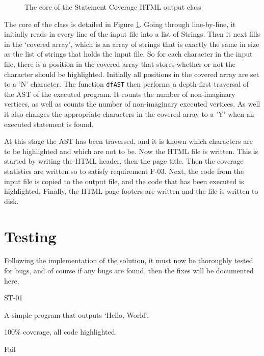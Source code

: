 
\begin{figure}[h]
	
	\caption{The core of the Statement Coverage HTML output class}
	\label{lst:StatementCoverageHTMLCore}
\end{figure}

The core of the class is detailed in Figure \ref{lst:StatementCoverageHTMLCore}. Going through line-by-line, it initially reads in every line of the input file into a list of Strings. Then it next fills in the `covered array', which is an array of strings that is exactly the same in size as the list of strings that holds the input file. So for each character in the input file, there is a position in the covered array that stores whether or not the character should be highlighted. Initially all positions in the covered array are set to a 'N' character. The function \verb|dfAST| then performs a depth-first traversal of the AST of the executed program. It counts the number of non-imaginary vertices, as well as counts the number of non-imaginary executed vertices. As well it also changes the appropriate characters in the covered array to a 'Y' when an executed statement is found. 

At this stage the AST has been traversed, and it is known which characters are to be highlighted and which are not to be. Now the HTML file is written. This is started by writing the HTML header, then the page title. Then the coverage statistics are written so to satisfy requirement F-03. Next, the code from the input file is copied to the output file, and the code that has been executed is highlighted. Finally, the HTML page footers are written and the file is written to disk.

\section{Testing}
Following the implementation of the solution, it must now be thoroughly tested for bugs, and of course if any bugs are found, then the fixes will be documented here.

\begin{samepage}
\begin{description}[style=sameline,leftmargin=3.5cm,nolistsep]
\item[\hspace*{0.3cm}Label] ST-01
\item[\hspace*{0.3cm}Description] A simple program that outputs `Hello, World'.
\item[\hspace*{0.3cm}Expected Output] 100\% coverage, all code highlighted.
\item[\hspace*{0.3cm}Result] Fail
\end{description}
\end{samepage}

